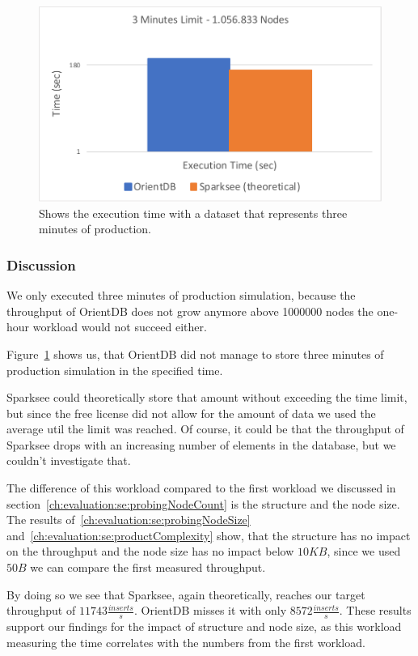 \begin{figure}[h!]
  \centering
  \includegraphics[width=.75\textwidth]{images/production/singleSuitability}
  \caption{Shows the execution time with a dataset that represents three minutes of production.}
  \label{fig:singleSuitability}
\end{figure}

\subsubsection{Discussion}
\label{ch:evaluation:se:suitabilityDiscussion}
We only executed three minutes of production simulation,
because the throughput of OrientDB does not grow anymore above 1000000 nodes the one-hour workload would not succeed either.

Figure~\ref{fig:singleSuitability} shows us,
that OrientDB did not manage to store three minutes of production simulation in the specified time.

Sparksee could theoretically store that amount without exceeding the time limit,
but since the free license did not allow for the amount of data we used the average util the limit was reached.
Of course,
it could be that the throughput of Sparksee drops with an increasing number of elements in the database,
but we couldn't investigate that.

The difference of this workload compared to the first workload we discussed in section~\ref{ch:evaluation:se:probingNodeCount} is the structure and the node size.
The results of~\ref{ch:evaluation:se:probingNodeSize} and~\ref{ch:evaluation:se:productComplexity} show,
that the structure has no impact on the throughput and the node size has no impact below $ 10KB $,
since we used $ 50B $ we can compare the first measured throughput.

By doing so we see that Sparksee,
again theoretically,
reaches our target throughput of $ 11743 \frac{inserts}{s} $.
OrientDB misses it with only $ 8572 \frac{inserts}{s} $.
These results support our findings for the impact of structure and node size,
as this workload measuring the time correlates with the numbers from the first workload.

